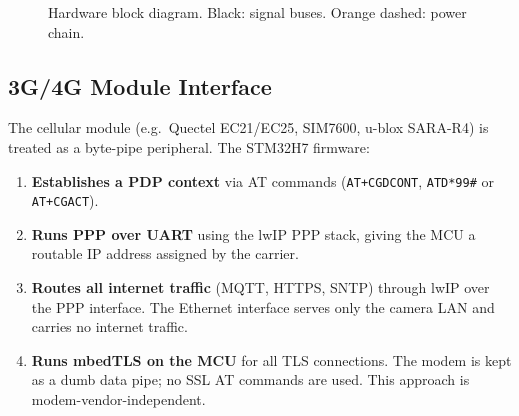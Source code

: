 \documentclass{article}
\begin{document}
\begin{figure}[h]
{%
}
\caption{Hardware block diagram. Black: signal buses. Orange dashed: power chain.}
\label{fig:hw-wiring}
\end{figure}

\subsection{3G/4G Module Interface}
\label{sec:modem-interface}

The cellular module (e.g.\ Quectel EC21/EC25, SIM7600, u-blox SARA-R4) is
treated as a byte-pipe peripheral. The STM32H7 firmware:

\begin{enumerate}[leftmargin=*, label=\arabic*.]
    \item \textbf{Establishes a PDP context} via AT commands
          (\texttt{AT+CGDCONT}, \texttt{ATD*99\#} or \texttt{AT+CGACT}).
    \item \textbf{Runs PPP over UART} using the lwIP PPP stack, giving the
          MCU a routable IP address assigned by the carrier.
    \item \textbf{Routes all internet traffic} (MQTT, HTTPS, SNTP) through
          lwIP over the PPP interface. The Ethernet interface serves only
          the camera LAN and carries no internet traffic.
    \item \textbf{Runs mbedTLS on the MCU} for all TLS connections. The
          modem is kept as a dumb data pipe; no SSL AT commands are used.
          This approach is modem-vendor-independent.
\end{enumerate}
\end{document}

